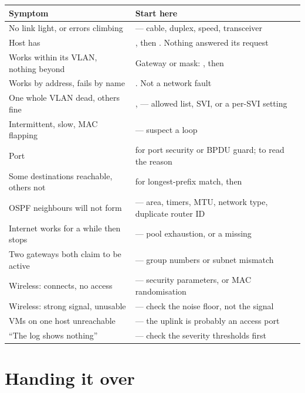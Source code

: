 \begin{longtable}{@{}L{6.5cm}L{8.5cm}@{}}
\toprule
{}
\textbf{Symptom} & \textbf{Start here} \\
\midrule
\endhead
No link light, or errors climbing &
 --- cable, duplex, speed, transceiver \\
Host has  &
, then . Nothing answered its request \\
Works within its VLAN, nothing beyond &
Gateway or mask: , then  \\
Works by address, fails by name &
. Not a network fault \\
One whole VLAN dead, others fine &
,  --- allowed list, SVI, or a per-SVI setting \\
Intermittent, slow, MAC flapping &
 --- suspect a loop \\
Port  &
 for port security or BPDU guard;  to read
the reason \\
Some destinations reachable, others not &
 for longest-prefix match, then  \\
OSPF neighbours will not form &
 --- area, timers, MTU, network type, duplicate router ID \\
Internet works for a while then stops &
 --- pool exhaustion, or a missing  \\
Two gateways both claim to be active &
 --- group numbers or subnet mismatch \\
Wireless: connects, no access &
 --- security parameters, or MAC randomisation \\
Wireless: strong signal, unusable &
 --- check the noise floor, not the signal \\
VMs on one host unreachable &
 --- the uplink is probably an access port \\
``The log shows nothing'' &
 --- check the severity thresholds first \\
\bottomrule
\end{longtable}

\section{Handing it over}

